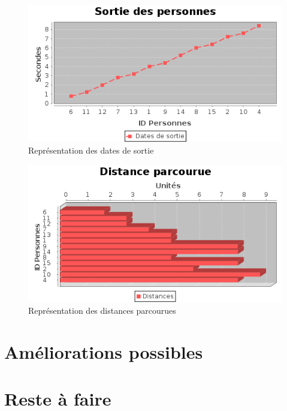 \documentclass[twoside,UTF8]{EPURapport}
\begin{document}
	\begin{figure}[htb]
	\centering
	\includegraphics[scale=0.7]{imagesPNG/dateSortie.png}
	\caption{Représentation des dates de sortie}
	\label{fig:date_sortie}
	\end{figure}
	
	\begin{figure}[htb]
	\centering
	\includegraphics[scale=0.7]{imagesPNG/distanceParcourue.png}
	\caption{Représentation des distances parcourues}
	\label{fig:distances_parcourues}
	\end{figure}
	
	\section{Améliorations possibles}

	\section{Reste à faire}
	
\annexes
\end{document}
